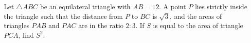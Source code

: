 Let $\triangle ABC$ be an equilateral triangle with $AB=12$. A point $P$ lies strictly inside the triangle such that the distance from $P$ to $BC$ is $\sqrt{3}$, and the areas of triangles $PAB$ and $PAC$ are in the ratio $2:3$. If $S$ is equal to the area of triangle $PCA$, find $S^2$.
